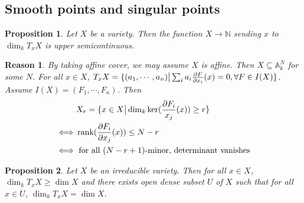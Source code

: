 \documentclass{ctexart}
\newtheorem{proposition}{Proposition}[section]
\newtheorem{reason}{Reason}[section]
\newcommand{\rank}{\operatorname{rank}}
\begin{document}
\subsection{Smooth points and singular points}
\label{subsection:Smooth_Points_and_Smooth_Morphisms_Smooth_points_and_singular_points}

\begin{proposition}
    Let $X$ be a variety.
    Then the function $X \rightarrow \mathbb{N}$ sending $x$ to $\dim_{k} T_{x}X$ is upper semicontinuous.
    \label{Proposition 5.1}
\end{proposition}
\begin{reason}
    By taking affine cover, we may assume $X$ is affine.
    Then $X \subseteq \mathbb{A}_{k}^{N}$ for some $N$.
    For all $x\in X$, $T_{x}X = \{(a_{1}, \cdots, a_{n}) \big{|} \sum_{i} a_{i}\frac{\partial F}{\partial x_{i}}(x) = 0, \forall F\in I(X)\}$.
    Assume $I(X) = (F_{1}, \cdots, F_{n})$.
    Then
    \begin{equation}
        \begin{split}
            & X_{r} = \{x\in X \big{|} \dim_{k} \ker (\frac{\partial F_{i}}{x_{j}}(x)) \ge r\} \\
            \iff & \rank(\frac{\partial F_{i}}{\partial x_{j}}(x)) \le N - r \\
            \iff & \text{ for all $(N - r + 1)$-minor, determinant vanishes}
        \end{split}
    \end{equation}
    \vspace{-\baselineskip} %
\end{reason}
\begin{proposition}
    Let $X$ be an irreducible variety.
    Then for all $x\in X$, $\dim_{k} T_{x}X \ge \dim X$ and there exists open dense subset $U$ of $X$ such that for all $x\in U$, $\dim_{k} T_{x}X = \dim X$.
    \label{Proposition 5.2}
\end{proposition}
\end{document}
